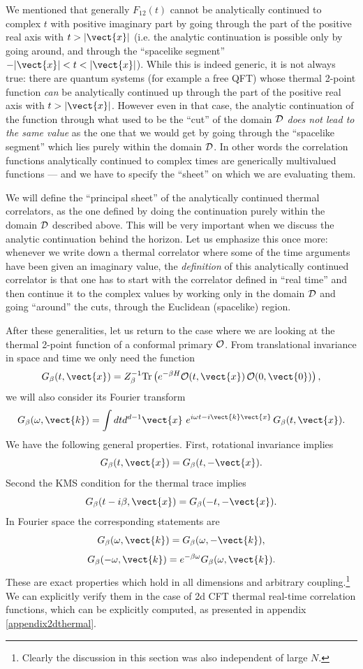 We mentioned that generally $F_{12}(t)$ cannot  be analytically continued to complex $t$ with positive imaginary part by going through the part of the positive real axis with $t>|\vect{x}|$ (i.e. the analytic continuation is possible only by going around, and through the ``spacelike segment'' $-|\vect{x}|<t<|\vect{x}|$). While this is indeed  generic, it is not always true: there are quantum systems (for example a free QFT) whose thermal 2-point function {\it can} be analytically continued up through the part of the positive real axis with $t>|\vect{x}|$. However even in that case, the analytic continuation of the function through what used to be the ``cut'' of the domain ${\cal D}$ {\it does not lead to the same value} as the one that we would get by going through the ``spacelike segment'' which lies purely within the domain ${\cal D}$. In other words the correlation functions analytically continued to complex times are generically multivalued functions --- and we have to specify the ``sheet'' on 
which we are evaluating them.

We will define the ``principal sheet'' of the analytically continued thermal correlators, as the one defined by doing the continuation purely within the domain ${\cal D}$ described above. This will be very important when we discuss the analytic continuation behind the horizon. Let us emphasize this once more: whenever we write down a thermal correlator where some of the time arguments have been given an imaginary value, the {\it definition} of this analytically continued correlator is that one has to start with the correlator defined in ``real time'' and then continue it to the complex values by working only in the domain ${\cal D}$ and going ``around'' the cuts, through the Euclidean (spacelike) region. 

After these generalities, let us return to the case where we are looking at the thermal 2-point function of a conformal primary ${\cal O}$. From translational invariance in space and time we only need the function
\[
G_\beta(t,\vect{x}) = Z_{\beta}^{-1}{\rm Tr}\left(e^{-\beta H}{\cal O}(t,\vect{x})\,{\cal O}(0,\vect{0})\right),
\]
we will also consider its Fourier transform
\[
G_\beta(\omega,\vect{k}) = \int dt d^{d-1}\vect{x} \,\, e^{i \omega t - i \vect{k}
\vect{x}}\,G_{\beta}(t,\vect{x}).
\]
We have the following general properties. First, rotational invariance implies
\[
G_\beta(t,\vect{x}) = G_\beta(t,-\vect{x}).
\]
Second the KMS condition for the thermal trace implies
\[
G_{\beta}(t-i\beta,\vect{x}) = G_\beta(-t,-\vect{x}).
\]
In Fourier space the corresponding statements are
\[
G_\beta(\omega,\vect{k}) = G_\beta(\omega,-\vect{k}),
\label{rotfourier}
 \]
\[
G_\beta(-\omega,\vect{k}) = e^{-\beta \omega} G_\beta(\omega,\vect{k}).
\label{kmsfourier}
 \]
These are exact properties which hold in all dimensions and arbitrary coupling.\footnote{Clearly the discussion in this section was also independent of large $N$.} We can explicitly verify them in the case of 2d CFT thermal real-time correlation functions, which can be explicitly computed, as presented in appendix \ref{appendix2dthermal}. 

